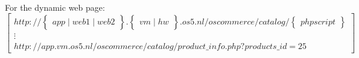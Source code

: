 \paragraph{}
For the dynamic web page:\\
$$ \begin{bmatrix}
http://  \begin{Bmatrix}app \mid web1 \mid web2 \end{Bmatrix} .  \begin{Bmatrix} vm \mid hw \end{Bmatrix} . os5 . nl /  oscommerce / catalog / \begin{Bmatrix} php script \end{Bmatrix}   \\ \vdots \\
http://  app .  vm . os5 . nl /  oscommerce / catalog / product\_info.php?products\_id=25   
\end{bmatrix}$$